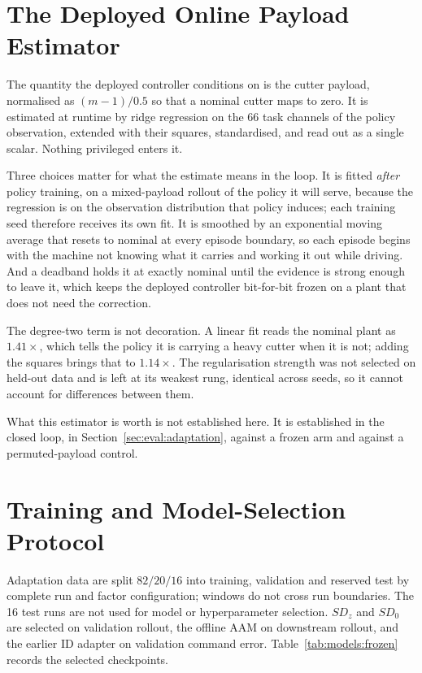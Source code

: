 \section{The Deployed Online Payload Estimator}
\label{sec:models:payload}

The quantity the deployed controller conditions on is the cutter payload,
normalised as $(m-1)/0.5$ so that a nominal cutter maps to zero. It is estimated
at runtime by ridge regression on the $66$ task channels of the policy
observation, extended with their squares, standardised, and read out as a single
scalar. Nothing privileged enters it.

Three choices matter for what the estimate means in the loop. It is fitted
\emph{after} policy training, on a mixed-payload rollout of the policy it will
serve, because the regression is on the observation distribution that policy
induces; each training seed therefore receives its own fit. It is smoothed by an
exponential moving average that resets to nominal at every episode boundary, so
each episode begins with the machine not knowing what it carries and working it
out while driving. And a deadband holds it at exactly nominal until the evidence
is strong enough to leave it, which keeps the deployed controller bit-for-bit
frozen on a plant that does not need the correction.

The degree-two term is not decoration. A linear fit reads the nominal plant as
$1.41\times$, which tells the policy it is carrying a heavy cutter when it is
not; adding the squares brings that to $1.14\times$. The regularisation
strength was not selected on held-out data and is left at its weakest rung,
identical across seeds, so it cannot account for differences between them.

What this estimator is worth is not established here. It is established in the
closed loop, in Section~\ref{sec:eval:adaptation}, against a frozen arm and
against a permuted-payload control.

\section{Training and Model-Selection Protocol}
\label{sec:models:training}

Adaptation data are split $82/20/16$ into training, validation and reserved
test by complete run and factor configuration; windows do not cross run
boundaries. The 16 test runs are not used for model or hyperparameter selection.
$SD_z$ and $SD_0$ are selected on validation rollout, the offline AAM on
downstream rollout, and the earlier ID adapter on validation command error.
Table~\ref{tab:models:frozen} records the selected checkpoints.

